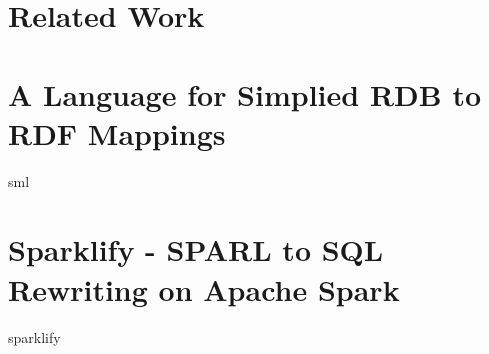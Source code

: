 \section{Related Work}

\section{A Language for Simplied RDB to RDF Mappings}
{
\let\section\subsection
\let\subsection\subsubsection
{sml}
}

\section{Sparklify - SPARL to SQL Rewriting on Apache Spark}
{
\let\section\subsection
\let\subsection\subsubsection
{sparklify}
}

